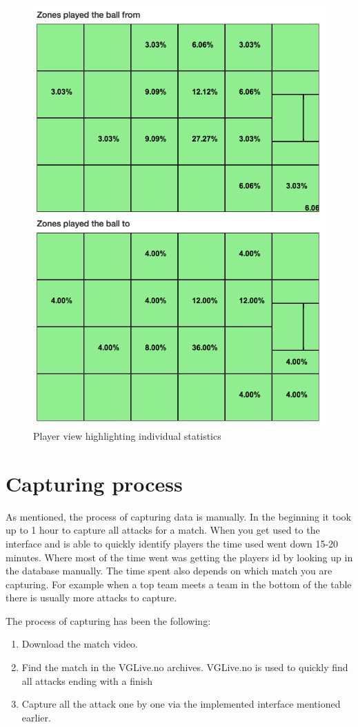 \begin{figure}[ht!]
\centering
\includegraphics[width=1\textwidth]{images/general/player_view2.png}
\caption{Player view highlighting individual statistics}
\label{fig:player_view2}
\end{figure}


\section{Capturing process}

As mentioned, the process of capturing data is manually. In the beginning it took up to 1 hour to capture all attacks for a match. When you get used to the interface and is able to quickly identify players the time used went down 15-20 minutes. Where most of the time went was getting the players id by looking up in the database manually. The time spent also depends on which match you are capturing. For example when a top team meets a team in the bottom of the table there is usually more attacks to capture. 

The process of capturing has been the following:
\begin{enumerate}
\item Download the match video.
\item Find the match in the VGLive.no archives. VGLive.no is used to quickly find all attacks ending with a finish
\item Capture all the attack one by one via the implemented interface mentioned earlier.
\end{enumerate}

